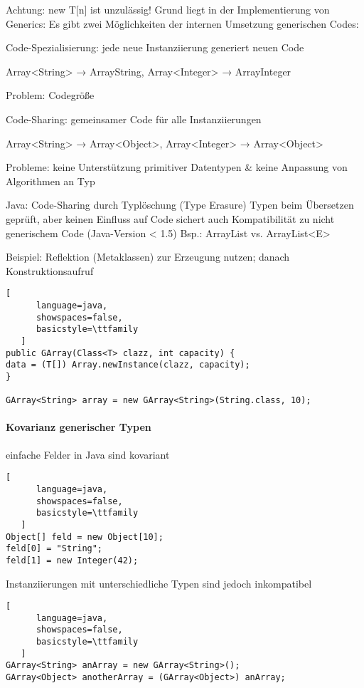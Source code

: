 \documentclass[10pt]{article}
\begin{document}
Achtung: new T[n] ist unzulässig! Grund liegt in der Implementierung von Generics:
Es gibt zwei Möglichkeiten der internen Umsetzung generischen Codes:
\begin{itemize*}
  \item Code-Spezialisierung: jede neue Instanziierung generiert neuen Code
  \begin{itemize*}
    \item Array<String> → ArrayString, Array<Integer> → ArrayInteger
    \item Problem: Codegröße
  \end{itemize*}
  \item Code-Sharing: gemeinsamer Code für alle Instanziierungen
  \begin{itemize*}
    \item Array<String> → Array<Object>, Array<Integer> → Array<Object>
    \item Probleme: keine Unterstützung primitiver Datentypen \& keine Anpassung von Algorithmen an Typ
  \end{itemize*}
\end{itemize*}
Java: Code-Sharing durch Typlöschung (Type Erasure)
Typen beim Übersetzen geprüft, aber keinen Einfluss auf Code
sichert auch Kompatibilität zu nicht generischem Code (Java-Version < 1.5) Bsp.: ArrayList vs. ArrayList<E>

Beispiel: Reflektion (Metaklassen) zur Erzeugung nutzen; danach Konstruktionsaufruf
\begin{lstlisting}[
      language=java,
      showspaces=false,
      basicstyle=\ttfamily
   ]
public GArray(Class<T> clazz, int capacity) {
data = (T[]) Array.newInstance(clazz, capacity);
}

GArray<String> array = new GArray<String>(String.class, 10);
\end{lstlisting}


\paragraph{Kovarianz generischer Typen}
einfache Felder in Java sind kovariant
\begin{lstlisting}[
      language=java,
      showspaces=false,
      basicstyle=\ttfamily
   ]
Object[] feld = new Object[10];
feld[0] = "String";
feld[1] = new Integer(42);
\end{lstlisting}

Instanziierungen mit unterschiedliche Typen sind jedoch inkompatibel
\begin{lstlisting}[
      language=java,
      showspaces=false,
      basicstyle=\ttfamily
   ]
GArray<String> anArray = new GArray<String>();
GArray<Object> anotherArray = (GArray<Object>) anArray;
\end{lstlisting}
\end{document}
